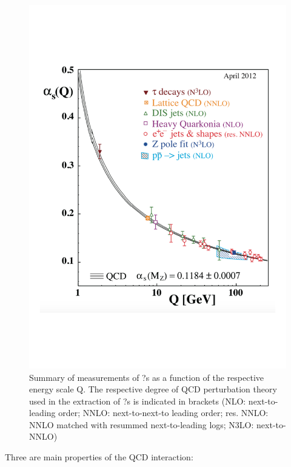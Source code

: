 \begin{figure}[htbp]
\begin{center}
\includegraphics[width=12.cm]{./Version1/FigChapter1/QCD_alpha}
\caption{Summary of measurements of ?s as a function of the respective energy scale Q. The respective degree of QCD perturbation theory used in the extraction of ?s is indicated in brackets (NLO: next-to-leading order; NNLO: next-to-next-to leading order; res. NNLO: NNLO matched with resummed next-to-leading logs; N3LO: next-to-NNLO) \cite{cite:PDG}}
\label{fig:alpha}
\end{center}
\end{figure}

Three are main properties of the QCD interaction: \\

